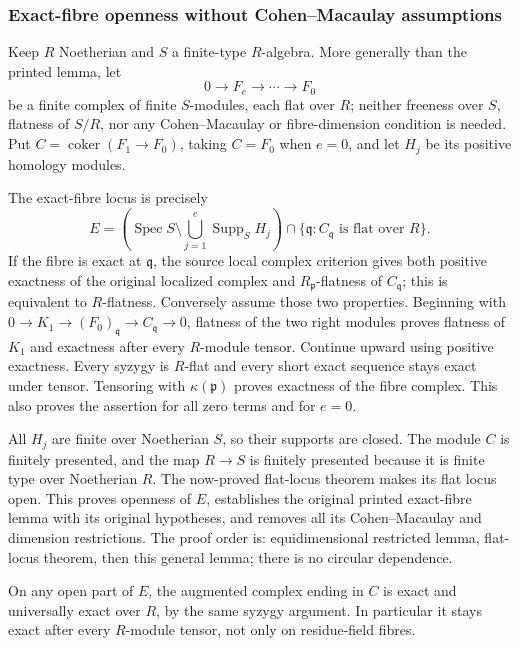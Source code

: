 \subsubsection{Exact-fibre openness without Cohen--Macaulay assumptions}\label{exact-fibre-openness-without-cohenmacaulay-assumptions}

Keep \(R\) Noetherian and \(S\) a finite-type \(R\)-algebra. More generally than the printed lemma, let \[
0\longrightarrow F_e\longrightarrow\cdots\longrightarrow F_0
\] be a finite complex of finite \(S\)-modules, each flat over \(R\); neither freeness over \(S\), flatness of \(S/R\), nor any Cohen--Macaulay or fibre-dimension condition is needed. Put \(C=\operatorname{coker}(F_1\to F_0)\), taking \(C=F_0\) when \(e=0\), and let \(H_j\) be its positive homology modules.

The exact-fibre locus is precisely \[
E=
\left(\operatorname{Spec}S\setminus\bigcup_{j=1}^e\operatorname{Supp}_S H_j\right)
\cap
\{\mathfrak q:C_{\mathfrak q}\text{ is flat over }R\}.
\] If the fibre is exact at \(\mathfrak q\), the source local complex criterion gives both positive exactness of the original localized complex and \(R_{\mathfrak p}\)-flatness of \(C_{\mathfrak q}\); this is equivalent to \(R\)-flatness. Conversely assume those two properties. Beginning with \(0\to K_1\to(F_0)_{\mathfrak q}\to C_{\mathfrak q}\to0\), flatness of the two right modules proves flatness of \(K_1\) and exactness after every \(R\)-module tensor. Continue upward using positive exactness. Every syzygy is \(R\)-flat and every short exact sequence stays exact under tensor. Tensoring with \(\kappa(\mathfrak p)\) proves exactness of the fibre complex. This also proves the assertion for all zero terms and for \(e=0\).

All \(H_j\) are finite over Noetherian \(S\), so their supports are closed. The module \(C\) is finitely presented, and the map \(R\to S\) is finitely presented because it is finite type over Noetherian \(R\). The now-proved flat-locus theorem makes its flat locus open. This proves openness of \(E\), establishes the original printed exact-fibre lemma with its original hypotheses, and removes all its Cohen--Macaulay and dimension restrictions. The proof order is: equidimensional restricted lemma, flat-locus theorem, then this general lemma; there is no circular dependence.

On any open part of \(E\), the augmented complex ending in \(C\) is exact and universally exact over \(R\), by the same syzygy argument. In particular it stays exact after every \(R\)-module tensor, not only on residue-field fibres.

